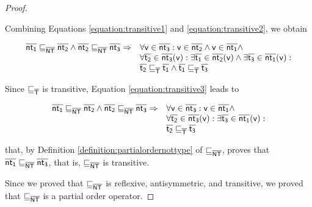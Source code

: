 \documentclass{llncs}
\begin{document}
\begin{lemma}
\begin{proof}
\begin{itemize}
Combining Equations \ref{equation:transitive1} and \ref{equation:transitive2}, we obtain

\begin{equation}
\label{equation:transitive3}
\begin{array}{ll}
\mathsf{\overline{nt_1}} \sqsubseteq_{\mathsf{\overline{NT}}} \mathsf{\overline{nt_2}} \land \mathsf{\overline{nt_2}} \sqsubseteq_{\mathsf{\overline{NT}}} \mathsf{\overline{nt_3}} \Rightarrow & 
\forall \mathsf{v} \in \mathsf{\overline{nt_3}} : \mathsf{v} \in \mathsf{\overline{nt_2}} \land \mathsf{v} \in \mathsf{\overline{nt_1}} \land\\
& \forall \mathsf{\overline{t_2}} \in \mathsf{\overline{nt_3}}(\mathsf{v}) : \exists \mathsf{\overline{t_1}} \in \mathsf{\overline{nt_2}}(\mathsf{v}) \land \exists \mathsf{\overline{t_3}} \in \mathsf{\overline{nt_1}}(\mathsf{v}) :\\
& \mathsf{\overline{t_2}} \sqsubseteq_{\mathsf{\overline{T}}} \mathsf{\overline{t_1}} \land \mathsf{\overline{t_1}} \sqsubseteq_{\mathsf{\overline{T}}} \mathsf{\overline{t_3}}
\end{array}
\end{equation}

Since $\sqsubseteq_{\mathsf{\overline{T}}}$ is transitive, Equation \ref{equation:transitive3} leads to 

\begin{equation}
\label{equation:transitive4}
\begin{array}{ll}
\mathsf{\overline{nt_1}} \sqsubseteq_{\mathsf{\overline{NT}}} \mathsf{\overline{nt_2}} \land \mathsf{\overline{nt_2}} \sqsubseteq_{\mathsf{\overline{NT}}} \mathsf{\overline{nt_3}} \Rightarrow & 
\forall \mathsf{v} \in \mathsf{\overline{nt_3}} : \mathsf{v} \in \mathsf{\overline{nt_1}} \land\\
& \forall \mathsf{\overline{t_2}} \in \mathsf{\overline{nt_3}}(\mathsf{v}) : \exists \mathsf{\overline{t_3}} \in \mathsf{\overline{nt_1}}(\mathsf{v}) :\\
& \mathsf{\overline{t_2}} \sqsubseteq_{\mathsf{\overline{T}}} \mathsf{\overline{t_3}}
\end{array}
\end{equation}

that, by Definition \ref{definition:partialordernottype} of $\sqsubseteq_{\mathsf{\overline{NT}}}$, proves that $\mathsf{\overline{nt_1}} \sqsubseteq_{\mathsf{\overline{NT}}} \mathsf{\overline{nt_3}}$, that is, $\sqsubseteq_{\mathsf{\overline{NT}}}$ is transitive.

\end{itemize}
Since we proved that $\sqsubseteq_{\mathsf{\overline{NT}}}$ is reflexive, antisymmetric, and transitive, we proved that $\sqsubseteq_{\mathsf{\overline{NT}}}$ is a partial order operator.
\end{proof}

\end{lemma}
\end{document}
